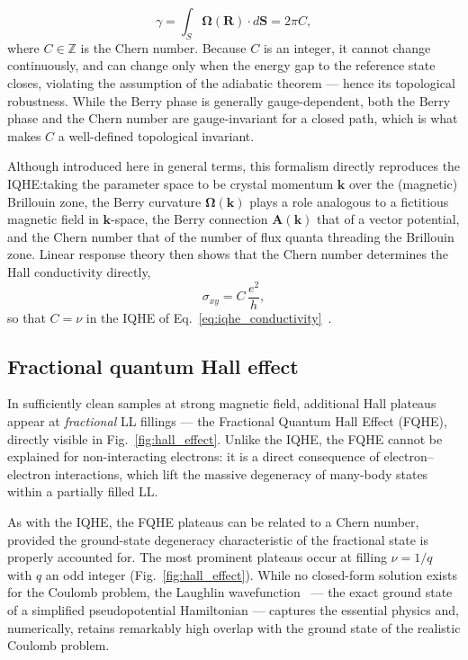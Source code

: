 \begin{equation}
    \gamma = \int_S \mathbf{\Omega}(\mathbf{R}) \cdot d\mathbf{S} = 2\pi C,
    \label{eq:chern_number}
\end{equation}
where $C \in \mathbb{Z}$ is the Chern number. Because $C$ is an integer, it cannot change continuously, and can change only when the energy gap to the reference state closes, violating the assumption of the adiabatic theorem --- hence its topological robustness. While the Berry phase is generally gauge-dependent, both the Berry phase and the Chern number are gauge-invariant for a closed path, which is what makes $C$ a well-defined topological invariant.

Although introduced here in general terms, this formalism directly reproduces the IQHE:\@ taking the parameter space to be crystal momentum $\mathbf{k}$ over the (magnetic) Brillouin zone, the Berry curvature $\mathbf{\Omega}(\mathbf{k})$ plays a role analogous to a fictitious magnetic field in $\mathbf{k}$-space, the Berry connection $\mathbf{A}(\mathbf{k})$ that of a vector potential, and the Chern number that of the number of flux quanta threading the Brillouin zone. Linear response theory then shows that the Chern number determines the Hall conductivity directly,
\begin{equation}
    \sigma_{xy} = C \, \frac{e^2}{h},
    \label{eq:chern_conductivity}
\end{equation}
so that $C = \nu$ in the IQHE of Eq.~\eqref{eq:iqhe_conductivity}~\cite{tong2016lectures}.

\subsection{Fractional quantum Hall effect}
In sufficiently clean samples at strong magnetic field, additional Hall plateaus appear at \emph{fractional} LL fillings --- the Fractional Quantum Hall Effect (FQHE), directly visible in Fig.~\ref{fig:hall_effect}. Unlike the IQHE, the FQHE cannot be explained for non-interacting electrons: it is a direct consequence of electron--electron interactions, which lift the massive degeneracy of many-body states within a partially filled LL.\@ %

As with the IQHE, the FQHE plateaus can be related to a Chern number, provided the ground-state degeneracy characteristic of the fractional state is properly accounted for. The most prominent plateaus occur at filling $\nu = 1/q$ with $q$ an odd integer (Fig.~\ref{fig:hall_effect}). While no closed-form solution exists for the Coulomb problem, the Laughlin wavefunction~\cite{laughlin1983anomalous} --- the exact ground state of a simplified pseudopotential Hamiltonian --- captures the essential physics and, numerically, retains remarkably high overlap with the ground state of the realistic Coulomb problem.

